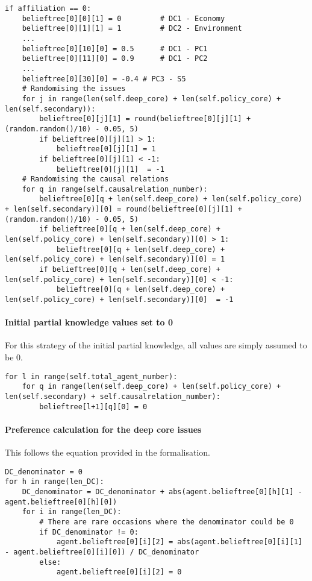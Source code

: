 \begin{lstlisting}
if affiliation == 0:
	belieftree[0][0][1] = 0 		# DC1 - Economy
	belieftree[0][1][1] = 1 		# DC2 - Environment
	...
	belieftree[0][10][0] = 0.5		# DC1 - PC1
	belieftree[0][11][0] = 0.9		# DC1 - PC2
	...
	belieftree[0][30][0] = -0.4	# PC3 - S5
	# Randomising the issues
	for j in range(len(self.deep_core) + len(self.policy_core) + len(self.secondary)):
		belieftree[0][j][1] = round(belieftree[0][j][1] + (random.random()/10) - 0.05, 5)
		if belieftree[0][j][1] > 1:
			belieftree[0][j][1] = 1
		if belieftree[0][j][1] < -1:
			belieftree[0][j][1]  = -1
	# Randomising the causal relations
	for q in range(self.causalrelation_number):
		belieftree[0][q + len(self.deep_core) + len(self.policy_core) + len(self.secondary)][0] = round(belieftree[0][j][1] + (random.random()/10) - 0.05, 5)
		if belieftree[0][q + len(self.deep_core) + len(self.policy_core) + len(self.secondary)][0] > 1:
			belieftree[0][q + len(self.deep_core) + len(self.policy_core) + len(self.secondary)][0] = 1
		if belieftree[0][q + len(self.deep_core) + len(self.policy_core) + len(self.secondary)][0] < -1:
			belieftree[0][q + len(self.deep_core) + len(self.policy_core) + len(self.secondary)][0]  = -1	
\end{lstlisting}

\paragraph{Initial partial knowledge values set to 0}

For this strategy of the initial partial knowledge, all values are simply assumed to be 0.

\begin{lstlisting}
for l in range(self.total_agent_number):
	for q in range(len(self.deep_core) + len(self.policy_core) + len(self.secondary) + self.causalrelation_number):
		belieftree[l+1][q][0] = 0
\end{lstlisting}

\paragraph{Preference calculation for the deep core issues}

This follows the equation provided in the formalisation.

\begin{lstlisting}
DC_denominator = 0
for h in range(len_DC):
	DC_denominator = DC_denominator + abs(agent.belieftree[0][h][1] - agent.belieftree[0][h][0])
	for i in range(len_DC):
		# There are rare occasions where the denominator could be 0
		if DC_denominator != 0:
			agent.belieftree[0][i][2] = abs(agent.belieftree[0][i][1] - agent.belieftree[0][i][0]) / DC_denominator
		else:
			agent.belieftree[0][i][2] = 0
\end{lstlisting}

